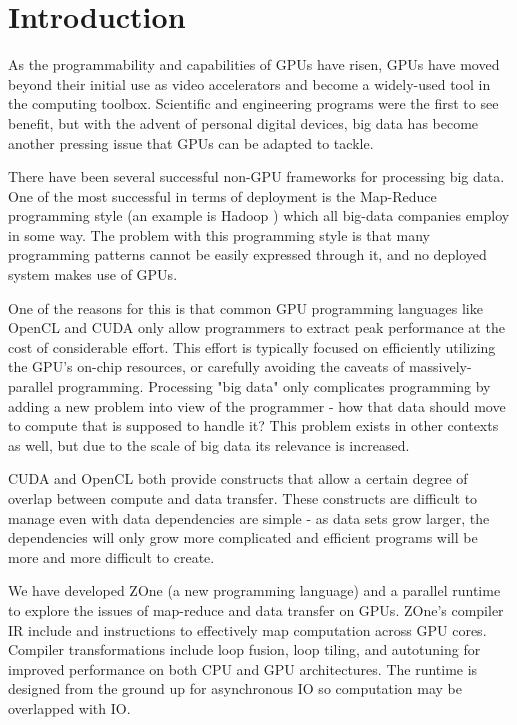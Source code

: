 \section*{Introduction}

As the programmability and capabilities of GPUs have risen, GPUs have moved
beyond their initial use as video accelerators and become a widely-used tool
in the computing toolbox. Scientific and engineering programs were the first
to see benefit, but with the advent of personal digital devices, big data has
become another pressing issue that GPUs can be adapted to tackle.

There have been several successful non-GPU frameworks for processing big data.
One of the most successful in terms of deployment is the
Map-Reduce\cite{MapReduce} programming style (an example is Hadoop
\cite{Hadoop}) which
all big-data companies employ in some way. The problem with this
programming style is that many programming patterns cannot be easily
expressed through it, and no deployed system makes use of GPUs.

One of the reasons for this is that common GPU programming languages like
OpenCL and CUDA only allow programmers to extract peak performance
at the cost of
considerable effort. This effort is typically focused on efficiently
utilizing the GPU's
on-chip resources, or carefully avoiding the caveats of massively-parallel
programming. Processing "big data" only complicates programming by adding
a new problem into view of the
programmer - how that data should move to compute that is supposed to
handle it? This problem exists in other contexts as well, but due to the scale
of big data its relevance is increased.

CUDA and OpenCL both provide constructs that allow a certain degree of
overlap between compute and data transfer. These constructs are difficult to
manage even with data dependencies are simple - as data sets grow larger, the
dependencies will only grow more complicated and efficient programs will be
more and more difficult to create.

We have developed ZOne (a new programming language) and a parallel runtime
to explore the issues of map-reduce and data transfer on GPUs.
ZOne's compiler IR include  and 
 instructions to effectively map computation across
GPU cores. Compiler transformations include loop fusion,
loop tiling, and autotuning for improved performance on both CPU
and GPU architectures. The runtime is designed from the ground up
for asynchronous IO so computation may be overlapped with IO.
